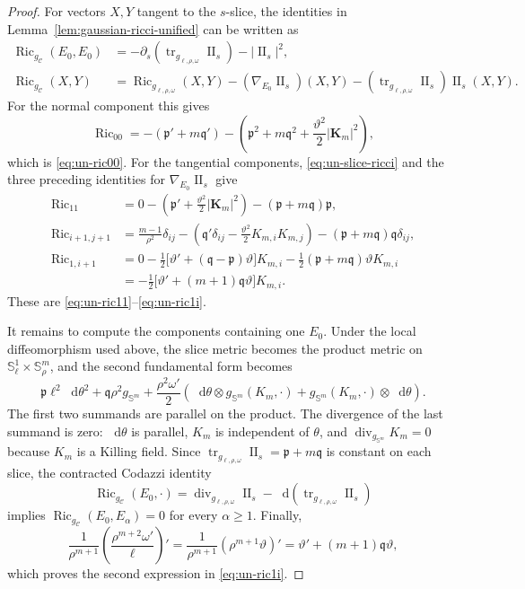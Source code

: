 \documentclass[11pt,reqno]{amsart}
\theoremstyle{definition}
\numberwithin{equation}{section}
\DeclareMathOperator{\Ric}{Ric}
\DeclareMathOperator{\II}{II}
\newcommand{\dd}{\mathop{}\!\mathrm d}
\begin{document}
\begin{proof}
For vectors \(X,Y\) tangent to the \(s\)-slice, the
identities in Lemma~\ref{lem:gaussian-ricci-unified} can be written as
\begin{align*}
 \Ric_{g_{\mathcal C}}(E_0,E_0)
 &=-\partial_s
   (\operatorname{tr}_{g_{\ell,\rho,\omega}}\II_s)-|\II_s|^2,\\
 \Ric_{g_{\mathcal C}}(X,Y)
 &=\Ric_{g_{\ell,\rho,\omega}}(X,Y)
  -(\nabla_{E_0}\II_s)(X,Y)
  -(\operatorname{tr}_{g_{\ell,\rho,\omega}}\II_s)\II_s(X,Y).
\end{align*}
For the normal component this gives
\[
 \Ric_{00}
 =-(\mathfrak p'+m\mathfrak q')
  -\left(\mathfrak p^2+m\mathfrak q^2
          +\frac{\vartheta^2}{2}\lvert\mathbf K_m\rvert^2\right),
\]
which is \eqref{eq:un-ric00}.  For the tangential components,
\eqref{eq:un-slice-ricci} and
the three preceding identities for \(\nabla_{E_0}\II_s\)
give
\begin{align*}
 \Ric_{11}
 &=0-\left(\mathfrak p'
       +\frac{\vartheta^2}{2}\lvert\mathbf K_m\rvert^2\right)
   -(\mathfrak p+m\mathfrak q)\mathfrak p,\\
 \Ric_{i+1,j+1}
 &=\frac{m-1}{\rho^2}\delta_{ij}
   -\left(\mathfrak q'\delta_{ij}
          -\frac{\vartheta^2}{2}K_{m,i}K_{m,j}\right)
   -(\mathfrak p+m\mathfrak q)\mathfrak q\delta_{ij},\\
 \Ric_{1,i+1}
 &=0-\frac12\bigl[\vartheta'+(\mathfrak q-\mathfrak p)\vartheta\bigr]K_{m,i}
   -\frac12(\mathfrak p+m\mathfrak q)\vartheta K_{m,i}\\
 &=-\frac12\bigl[\vartheta'+(m+1)\mathfrak q\vartheta\bigr]K_{m,i}.
\end{align*}
These are \eqref{eq:un-ric11}--\eqref{eq:un-ric1i}.

It remains to compute the components containing one \(E_0\).  Under the
local diffeomorphism used above, the slice metric becomes the product
metric on \(\mathbb S^1_\ell\times\mathbb S^m_\rho\), and the second
fundamental form becomes
\[
 \mathfrak p\ell^2\dd\theta^2+\mathfrak q\rho^2g_{\mathbb S^m}
 +\frac{\rho^2\omega'}2\left(
   \dd\theta\otimes g_{\mathbb S^m}(K_m,\mathord\cdot)
   +g_{\mathbb S^m}(K_m,\mathord\cdot)\otimes\dd\theta\right).
\]
The first two summands are parallel on the product.  The divergence of
the last summand is zero: \(\dd\theta\) is parallel, \(K_m\) is
independent of \(\theta\), and
\(\operatorname{div}_{g_{\mathbb S^m}}K_m=0\) because \(K_m\) is a
Killing field.  Since
\(\operatorname{tr}_{g_{\ell,\rho,\omega}}\II_s
=\mathfrak p+m\mathfrak q\) is constant on each slice,
the contracted Codazzi identity
\[
 \Ric_{g_{\mathcal C}}(E_0,\mathord\cdot)
 =\operatorname{div}_{g_{\ell,\rho,\omega}}\II_s
  -\dd(\operatorname{tr}_{g_{\ell,\rho,\omega}}\II_s)
\]
implies \(\Ric_{g_{\mathcal C}}(E_0,E_\alpha)=0\) for every \(\alpha\ge1\).
Finally,
\[
 \frac1{\rho^{m+1}}
 \left(\frac{\rho^{m+2}\omega'}{\ell}\right)'
 =\frac1{\rho^{m+1}}(\rho^{m+1}\vartheta)'
 =\vartheta'+(m+1)\mathfrak q\vartheta,
\]
which proves the second expression in \eqref{eq:un-ric1i}.
\end{proof}
\end{document}
